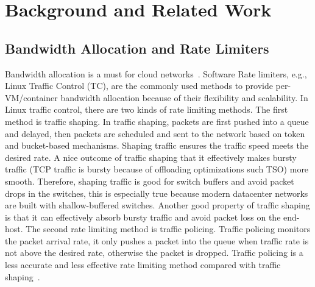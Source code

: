 \section{Background and Related Work}
\label{sec:background} 


\subsection{Bandwidth Allocation and Rate Limiters}
\label{sec:bandwidth-allocation-in-clouds}
Bandwidth allocation is a must for cloud networks~\cite{shieh2011sharing,jeyakumar2013eyeq,rodrigues2011gatekeeper}. 
Software Rate limiters, e.g., Linux Traffic Control (TC), are the commonly used methods
to provide per-VM/container bandwidth allocation because of their flexibility and scalability.
In Linux traffic control, there are two kinds of rate limiting methods.
The first method is traffic shaping. In traffic shaping, packets are first pushed into a queue and delayed,
then packets are scheduled and sent to the network based on token and bucket-based mechanisms.
Shaping traffic ensures the traffic speed meets the desired rate.
A nice outcome of traffic shaping that it effectively makes bursty traffic
(TCP traffic is bursty because of offloading optimizations such TSO) more smooth.
Therefore, shaping traffic is good for switch buffers and avoid packet drops in the switches,
this is especially true because modern datacenter networks are built with shallow-buffered switches.
Another good property of traffic shaping is that it can effectively absorb bursty traffic and avoid
packet loss on the end-host.
The second rate limiting method is traffic policing. Traffic policing monitors the packet arrival rate,
it only pushes a packet into the queue when traffic rate is not above the desired rate,
otherwise the packet is dropped. Traffic policing is a less accurate and less effective
rate limiting method compared with traffic shaping~\cite{ovs-qos}.

